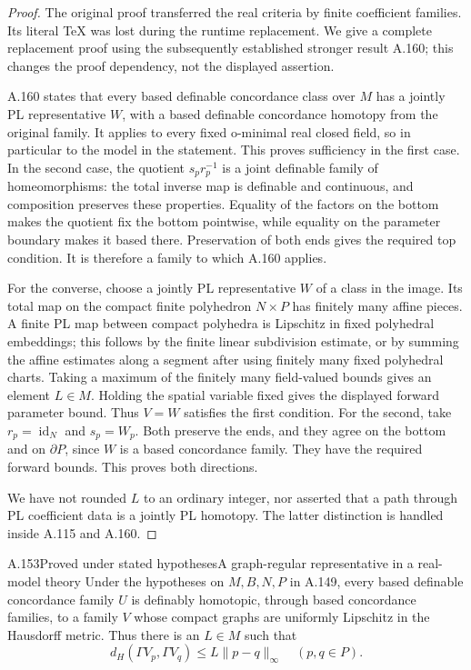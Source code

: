 \begin{proof}
The original proof transferred the real criteria by finite coefficient
families. Its literal TeX was lost during the runtime replacement.
We give a complete replacement proof using the subsequently established
stronger result A.160; this changes the proof dependency, not the
displayed assertion.

A.160 states that every based definable concordance class over \(M\)
has a jointly PL representative \(W\), with a based definable
concordance homotopy from the original family. It applies to every
fixed o-minimal real closed field, so in particular to the model in
the statement. This proves sufficiency in the first case. In the
second case, the quotient \(s_pr_p^{-1}\) is a joint definable family
of homeomorphisms: the total inverse map is definable and continuous,
and composition preserves these properties. Equality of the factors
on the bottom makes the quotient fix the bottom pointwise, while
equality on the parameter boundary makes it based there. Preservation
of both ends gives the required top condition. It is therefore a
family to which A.160 applies.

For the converse, choose a jointly PL representative \(W\) of a class
in the image. Its total map on the compact finite polyhedron
\(N\times P\) has finitely many affine pieces. A finite PL map between
compact polyhedra is Lipschitz in fixed polyhedral embeddings; this
follows by the finite linear subdivision estimate, or by summing the
affine estimates along a segment after using finitely many fixed
polyhedral charts. Taking a maximum of the finitely many field-valued
bounds gives an element \(L\in M\). Holding the spatial variable fixed
gives the displayed forward parameter bound. Thus \(V=W\) satisfies
the first condition. For the second, take \(r_p=\operatorname{id}_N\)
and \(s_p=W_p\). Both preserve the ends, and they agree on the bottom
and on \(\partial P\), since \(W\) is a based concordance family.
They have the required forward bounds. This proves both directions.

We have not rounded \(L\) to an ordinary integer, nor asserted that a
path through PL coefficient data is a jointly PL homotopy. The latter
distinction is handled inside A.115 and A.160.
\end{proof}

\begin{saresult}{A.153}{Proved under stated hypotheses}{A graph-regular representative in a real-model theory}
Under the hypotheses on \(M,B,N,P\) in A.149, every based definable
concordance family \(U\) is definably homotopic, through based
concordance families, to a family \(V\) whose compact graphs are
uniformly Lipschitz in the Hausdorff metric. Thus there is an
\(L\in M\) such that
\[
 d_H(\Gamma V_p,\Gamma V_q)\leq L\|p-q\|_\infty
 \quad(p,q\in P).
\]
\end{saresult}

